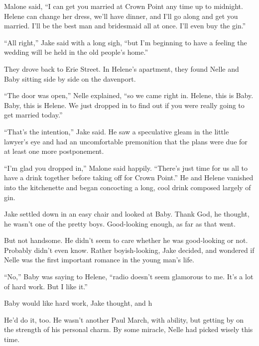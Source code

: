 \documentclass{novel}
\begin{document}
\begin{ChapterStart}
\vspace{3\nbs}
\end{ChapterStart}

Malone said, “I can get you married at Crown Point any time up to midnight. Helene can change her dress, we’ll have dinner, and I’ll go along and get you married. I’ll be the best man and bridesmaid all at once. I'll even buy the gin.”

“All right,” Jake said with a long sigh, “but I’m beginning to have a feeling the wedding will be held in the old people’s home.”

They drove back to Erie Street. In Helene’s apartment, they found Nelle and Baby sitting side by side on the davenport.

“The door was open,” Nelle explained, “so we came right in. Helene, this is Baby. Baby, this is Helene. We just dropped in to find out if you were really going to get married today.”

“That’s the intention,” Jake said. He saw a speculative gleam in the little lawyer’s eye and had an uncomfortable premonition that the plans were due for at least one more postponement.

“I’m glad you dropped in,” Malone said happily. “There’s just time for us all to have a drink together before taking off for Crown Point.” He and Helene vanished into the kitchenette and began concocting a long, cool drink composed largely of gin.

Jake settled down in an easy chair and looked at Baby. Thank God, he thought, he wasn’t one of the pretty boys. Good-looking enough, as far as that went.

But not handsome. He didn’t seem to care whether he was good-looking or not. Probably didn’t even know. Rather boyish-looking, Jake decided, and wondered if Nelle was the first important romance in the young man’s life.

“No,” Baby was saying to Helene, “radio doesn’t seem glamorous to me. It’s a lot of hard work. But I like it.”

Baby would like hard work, Jake thought, and h

He’d do it, too. He wasn’t another Paul March, with ability, but getting by on the strength of his personal charm. By some miracle, Nelle had picked wisely this time.
\end{document}
